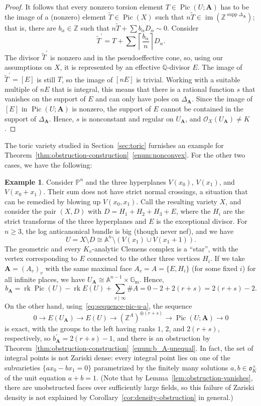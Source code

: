 \documentclass[a4paper, twoside, 10pt]{amsart}
\newcommand{\uA}{{\boldsymbol{A}}}
\newcommand{\cO}{\mathcal{O}}
\newcommand{\fo}{\mathfrak{o}}
\newcommand{\bAA}{\mathbb{A}}
\newcommand{\PP}{\mathbb{P}}
\newcommand{\ZZ}{\mathbb{Z}}
\newcommand{\multgrp}{\mathbb{G}_\mathrm{m}}
\newcommand{\QQ}{\mathbb{Q}}
\DeclareMathOperator{\im}{im}
\DeclareMathOperator{\Pic}{Pic}
\DeclareMathOperator{\rk}{rk}
\DeclareMathOperator{\supp}{supp}
\theoremstyle{definition}
\newtheorem{example}[theorem]{Example}
\begin{document}
\begin{proof}
  It follows that every nonzero torsion element $T\in\Pic(U;\uA)$ has to be the image of a (nonzero) element
  $\widetilde T\in\Pic(X)$ such that
  $n \widetilde{T} \in \im(\ZZ^{\supp{\Delta_\uA}})$;
  that is, there are $b_\alpha\in\ZZ$ such that $n \widetilde{T}+\sum b_\alpha D_\alpha \sim 0$. Consider
  \[
    \widetilde{T}^\prime = T + \sum \left\lceil\frac{b_\alpha}{n}\right\rceil D_\alpha.
  \]
  The divisor $\widetilde{T}^\prime$ is nonzero and in the pseudoeffective cone, so, using our assumptions on $X$, it is represented by an effective $\QQ$-divisor $E$.
  The image of $\widetilde{T}^\prime=[E]$ is still $T$, so the image of $[nE]$ is trivial. Working with a suitable multiple of $nE$ that is integral, this means that there is a rational function $s$ that vanishes on the support of $E$ and can only have poles on $\Delta_\uA$. Since the image of $[E]$ in $\Pic(U;\uA)$ is nonzero, the support of $E$ cannot be contained in the support of $\Delta_\uA$. Hence, $s$ is nonconstant and regular on $U_\uA$, and $\cO_X(U_\uA)\ne K$.
\end{proof}

The toric variety studied in Section~\ref{sec:toric} furnishes an example for Theorem~\ref{thm:obstruction-construction}~\eqref{enum:nonconvex}. For the other two cases, we have the following:

\begin{example}\label{ex:unitequation}
  Consider $\PP^n$ and the three hyperplanes $V(x_0)$, $V(x_1)$, and $V(x_0+x_1)$. Their sum does not have strict normal crossings, a situation that can be remedied by blowing up $V(x_0,x_1)$. Call the resulting variety $X$, and consider the pair $(X,D)$ with $D=H_1+H_2+H_3+E$, where the $H_i$ are the strict transforms of the three hyperplanes and $E$ is the exceptional divisor. For $n\ge 3$, the log anticanonical bundle is big (though never nef), and we have
  \[
    U=X\setminus D \cong \bAA^n \setminus (V(x_1)\cup V(x_1+1)).
  \]
  The geometric and every $K_v$-analytic Clemens complex is a ``star'', with the vertex corresponding to $E$ connected to the other three vertices $H_i$. If we take $\uA=(A_v)_v$ with the same maximal face $A_v=A=\{E,H_i\}$ (for some fixed $i$) for all infinite places, we have $U_\uA\cong \bAA^{n-1}\times \multgrp$. Hence,
  \[
    b_\uA=\rk\Pic(U) - \rk E(U) + \sum_{v\mid\infty} \# A = 0 - 2 + 2(r+s)=2(r+s)-2.
  \]
  On the other hand, using~\eqref{eq:sequence-pic-u-a}, the sequence
  \[
    0\to E(U_\uA) \to E(U) \to (\ZZ^A)^{\oplus (r+s)} \to \Pic(U;\uA) \to 0
  \]
  is exact, with the groups to the left having ranks $1$, $2$, and $2(r+s)$, respectively, so
  $b^\prime_\uA=2(r+s)-1$, and there is an obstruction by Theorem~\ref{thm:obstruction-construction}~\eqref{enum:b_A-unequal}. In fact, the set of integral points is not Zariski dense: every integral point lies on one of the subvarieties $\{ax_0-bx_1=0\}$ parametrized by the finitely many solutions $a,b\in\fo_K^\times$ of the unit equation $a+b=1$.
  (Note that by Lemma~\ref{lem:obstruction-vanishes}, there are unobstructed faces over sufficiently large fields, so this failure of Zariski density is not explained by Corollary~\ref{cor:density-obstruction} in general.)
\end{example}
\end{document}

